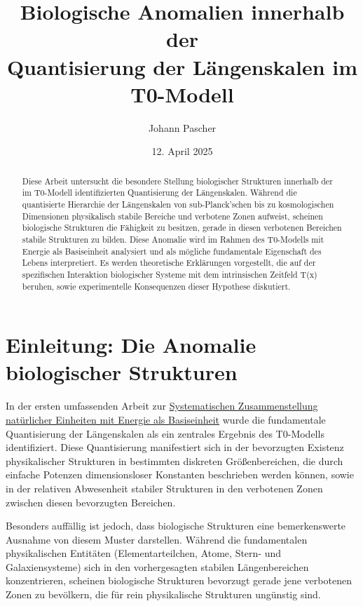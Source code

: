 \documentclass[12pt,a4paper]{article}
\title{Biologische Anomalien innerhalb der\\Quantisierung der Längenskalen im T0-Modell}
\author{Johann Pascher}
\date{12. April 2025}
\newcommand{\Tfield}{T(x)}
\begin{document}
	
	\maketitle
	
	\begin{abstract}
		Diese Arbeit untersucht die besondere Stellung biologischer Strukturen innerhalb der im T0-Modell identifizierten Quantisierung der Längen\-skalen. Während die quantisierte Hierarchie der Längen\-skalen von sub-Planck’schen bis zu kosmologischen Dimensionen physikalisch stabile Bereiche und \glqq verbotene Zonen\grqq{} aufweist, scheinen biologische Strukturen die Fähigkeit zu besitzen, gerade in diesen verbotenen Bereichen stabile Strukturen zu bilden. Diese Anomalie wird im Rahmen des T0-Modells mit Energie als Basis\-einheit analysiert und als mögliche fundamentale Eigenschaft des Lebens interpretiert. Es werden theoretische Erklärungen vorgestellt, die auf der spezifischen Interaktion biologischer Systeme mit dem intrinsischen Zeitfeld \Tfield{} beruhen, sowie experimentelle Konsequenzen dieser Hypothese diskutiert.
	\end{abstract}
	
	\section{Einleitung: Die Anomalie biologischer Strukturen}
	\label{sec:introduction}
	
	In der ersten umfassenden Arbeit zur \href{https://github.com/jpascher/T0-Time-Mass-Duality/blob/main/2/pdf/Deutsch/NatEinheitenSystematik.pdf}{Systematischen Zusammenstellung natürlicher Einheiten mit Energie als Basis\-einheit} \cite{pascher_nateinheiten_2025} wurde die fundamentale Quantisierung der Längen\-skalen als ein zentrales Ergebnis des T0-Modells identifiziert. Diese Quantisierung manifestiert sich in der bevorzugten Existenz physikalischer Strukturen in bestimmten diskreten Größen\-bereichen, die durch einfache Potenzen dimensionsloser Konstanten beschrieben werden können, sowie in der relativen Abwesenheit stabiler Strukturen in den \glqq verbotenen Zonen\grqq{} zwischen diesen bevorzugten Bereichen.
	
	Besonders auffällig ist jedoch, dass biologische Strukturen eine bemerkenswerte Ausnahme von diesem Muster darstellen. Während die fundamentalen physikalischen Entitäten (Elementar\-teilchen, Atome, Stern- und Galaxien\-systeme) sich in den vorhergesagten stabilen Längen\-bereichen konzentrieren, scheinen biologische Strukturen bevorzugt gerade jene \glqq verbotenen Zonen\grqq{} zu bevölkern, die für rein physikalische Strukturen ungünstig sind.
	
\end{document}
